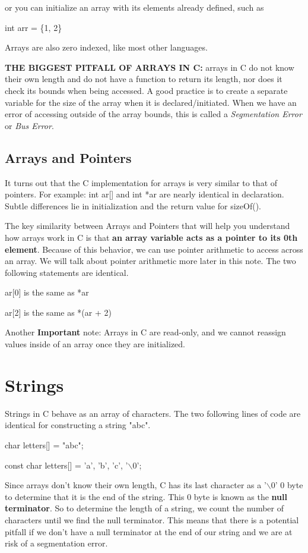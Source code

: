 \documentclass[letterpaper]{article}
\theoremstyle{remark}
\begin{document}
or you can initialize an array with its elements already defined, such as 

int arr = \{1, 2\}

Arrays are also zero indexed, like most other languages.

\textbf{THE BIGGEST PITFALL OF ARRAYS IN C:} arrays in C do not know their own length and do not have a function to return its length, nor does it check its bounds when being accessed. A good practice is to create a separate variable for the size of the array when it is declared/initiated. When we have an error of accessing outside of the array bounds, this is called a \textit{Segmentation Error} or \textit{Bus Error}.

\subsection{Arrays and Pointers}
It turns out that the C implementation for arrays is very similar to that of pointers. For example: int ar[] and int *ar are nearly identical in declaration. Subtle differences lie in initialization and the return value for sizeOf().

The key similarity between Arrays and Pointers that will help you understand how arrays work in C is that \textbf{an array variable acts as a pointer to its 0th element}. Because of this behavior, we can use pointer arithmetic to access across an array. We will talk about pointer arithmetic more later in this note. The two following statements are identical.

ar[0] is the same as *ar

ar[2] is the same as *(ar + 2)

Another \textbf{Important} note: Arrays in C are read-only, and we cannot reassign values inside of an array once they are initialized.


\section{Strings}
Strings in C behave as an array of characters. The two following lines of code are identical for constructing a string "abc".

char letters[] = "abc";

const char letters[] = {'a', 'b', 'c', '$\backslash$0'};

Since arrays don't know their own length, C has its last character as a '$\backslash$0' 0 byte to determine that it is the end of the string. This 0 byte is known as the \textbf{null terminator}. So to determine the length of a string, we count the number of characters until we find the null terminator. This means that there is a potential pitfall if we don't have a null terminator at the end of our string and we are at risk of a segmentation error.
\end{document}
